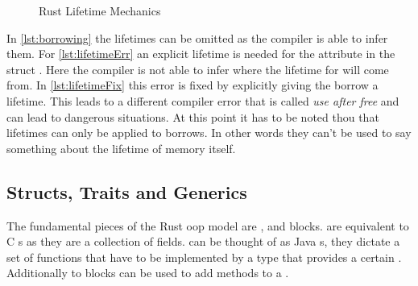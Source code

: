 \documentclass[thesis]{subfiles}
\begin{document}
    \newsavebox{\lifetimeFixBox}
    \begin{lrbox}{\lifetimeFixBox}%
      \begin{minipage}{.45\linewidth}
        
      \end{minipage}
    \end{lrbox}

    \begin{figure}[ht]
      \captionsetup{type=lstlisting}
       \hfill%
      \caption{Rust Lifetime Mechanics}\label{lst:lifetime}
    \end{figure}

    In \autoref{lst:borrowing} the lifetimes can be omitted as the compiler is able to infer them.
    For \autoref{lst:lifetimeErr} an explicit lifetime is needed for the attribute  in the struct .
    Here the compiler is not able to infer where the lifetime for  will come from.
    In \autoref{lst:lifetimeFix} this error is fixed by explicitly giving the borrow a lifetime.
    This leads to a different compiler error that is called \emph{use after free} and can lead to dangerous situations.
    At this point it has to be noted thou that lifetimes can only be applied to borrows.
    In other words they can't be used to say something about the lifetime of memory itself.

  \subsection{Structs, Traits and Generics}\label{sec:stg}
    The fundamental pieces of the Rust \gls{oop} model are \structs, \traits and  blocks.
    \structs are equivalent to C s as they are a collection of fields.
    \traits can be thought of as Java s, they dictate a set of functions that have to be implemented by a type that provides a certain \trait.
    Additionally to \traits {} blocks can be used to add methods to a \struct.
\end{document}
